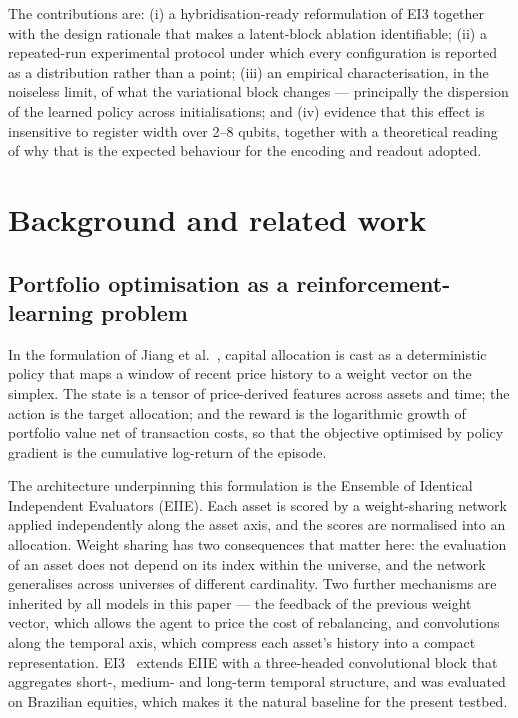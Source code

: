\documentclass[aps,floatfix,superscriptaddress,twocolumn,tightenlines,amsmath,amssymb,nofootinbib,10pt,longbibliography,prl]{revtex4-2}
\begin{document}
The contributions are: (i) a hybridisation-ready reformulation of EI3 together
with the design rationale that makes a latent-block ablation identifiable;
(ii) a repeated-run experimental protocol under which every configuration is
reported as a distribution rather than a point; (iii) an empirical
characterisation, in the noiseless limit, of what the variational block changes
--- principally the dispersion of the learned policy across initialisations;
and (iv) evidence that this effect is insensitive to register width over
\num{2}--\num{8} qubits, together with a theoretical reading of why that is the
expected behaviour for the encoding and readout adopted.

\section{Background and related work}
\label{sec:background}

\subsection{Portfolio optimisation as a reinforcement-learning problem}
\label{subsec:bg-portfolio}

In the formulation of Jiang et al.~\cite{jiang2017}, capital allocation is cast
as a deterministic policy that maps a window of recent price history to a weight
vector on the simplex. The state is a tensor of price-derived features across
assets and time; the action is the target allocation; and the reward is the
logarithmic growth of portfolio value net of transaction costs, so that the
objective optimised by policy gradient is the cumulative log-return of the
episode.

The architecture underpinning this formulation is the Ensemble of Identical
Independent Evaluators (EIIE). Each asset is scored by a weight-sharing network
applied independently along the asset axis, and the scores are normalised into
an allocation. Weight sharing has two consequences that matter here: the
evaluation of an asset does not depend on its index within the universe, and the
network generalises across universes of different cardinality. Two further
mechanisms are inherited by all models in this paper --- the feedback of the
previous weight vector, which allows the agent to price the cost of rebalancing,
and convolutions along the temporal axis, which compress each asset's history
into a compact representation. EI3~\cite{costa2023} extends EIIE with a
three-headed convolutional block that aggregates short-, medium- and long-term
temporal structure, and was evaluated on Brazilian equities, which makes it the
natural baseline for the present testbed.
\end{document}
